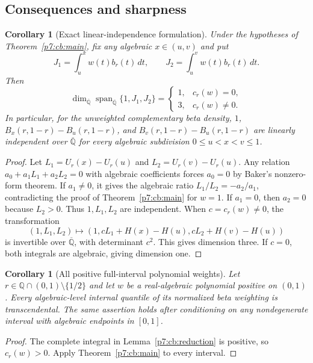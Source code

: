 \documentclass[11pt,a4paper]{article}
\newtheorem{corollary}[theorem]{Corollary}
\theoremstyle{definition}
\theoremstyle{remark}
\numberwithin{equation}{section}
\begin{document}
\subsection{Consequences and sharpness}

\begin{corollary}[Exact linear-independence formulation]
\label{p7:cb:rank}
Under the hypotheses of Theorem~\ref{p7:cb:main}, fix any algebraic
$x\in(u,v)$ and put
\[
 J_1=\int_u^x w(t)b_r(t)\,dt,\qquad
 J_2=\int_u^v w(t)b_r(t)\,dt.
\]
Then
\[
 \dim_{\overline{\mathbb Q}}
   \operatorname{span}_{\overline{\mathbb Q}}\{1,J_1,J_2\}
 =\begin{cases}1,&c_r(w)=0,\\3,&c_r(w)\ne0.\end{cases}
\]
In particular, for the unweighted complementary beta density,
$1$, $B_x(r,1-r)-B_u(r,1-r)$, and
$B_v(r,1-r)-B_u(r,1-r)$ are linearly independent over
$\overline{\mathbb Q}$ for every algebraic subdivision
$0\le u<x<v\le1$.
\end{corollary}

\begin{proof}
Let $L_1=U_r(x)-U_r(u)$ and $L_2=U_r(v)-U_r(u)$.
Any relation $a_0+a_1L_1+a_2L_2=0$ with algebraic
coefficients forces $a_0=0$ by Baker's nonzero-form theorem.
If $a_1\ne0$, it gives the algebraic ratio
$L_1/L_2=-a_2/a_1$, contradicting the proof of
Theorem~\ref{p7:cb:main} for $w=1$. If $a_1=0$, then
$a_2=0$ because $L_2>0$. Thus $1,L_1,L_2$ are independent.
When $c=c_r(w)\ne0$, the transformation
\[
 (1,L_1,L_2)\longmapsto
 (1,cL_1+H(x)-H(u),cL_2+H(v)-H(u))
\]
is invertible over $\overline{\mathbb Q}$, with determinant
$c^2$. This gives dimension three. If $c=0$, both integrals
are algebraic, giving dimension one.
\end{proof}

\begin{corollary}[All positive full-interval polynomial weights]
\label{p7:cb:full}
Let $r\in\mathbb Q\cap(0,1)\setminus\{1/2\}$ and let
$w$ be a real-algebraic polynomial positive on $(0,1)$.
Every algebraic-level internal quantile of its normalized
beta weighting is transcendental. The same assertion holds
after conditioning on any nondegenerate interval with
algebraic endpoints in $[0,1]$.
\end{corollary}

\begin{proof}
The complete integral in Lemma~\ref{p7:cb:reduction} is positive,
so $c_r(w)>0$. Apply Theorem~\ref{p7:cb:main} to every interval.
\end{proof}
\end{document}
